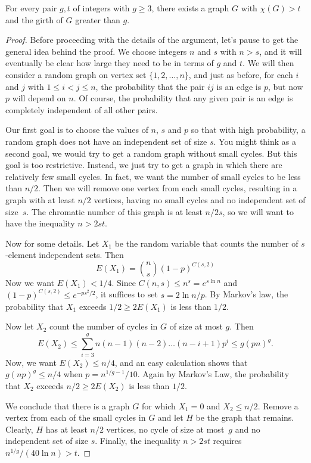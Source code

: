 \begin{theorem}[Erd\H{o}s]\label{thm:girth}
For every pair $g,t$ of integers with $g\ge3$, there exists
a graph $G$ with $\chi(G)>t$ and the girth of $G$ greater than $g$.
\end{theorem}

\begin{proof}
Before proceeding with the details of the argument, let's pause
to get the general idea behind the proof.  We choose integers
$n$ and $s$ with $n>s$, and it will eventually be clear how
large they need to be in terms of $g$ and $t$.  We will
then consider a random graph on vertex set $\{1,2,\dots,n\}$,
and just as before, for each $i$ and $j$ with $1\le i<j\le n$,
the probability that the pair $ij$ is an edge is $p$, but now
$p$ will depend on $n$.  Of course, the probability that any
given pair is an edge is completely independent of all other
pairs.

Our first goal is to choose the values of $n$, $s$ and $p$ so that
with high probability, a random graph does not have an independent
set of size $s$.  You might think as a second goal, we would try
to get a random graph without small cycles.  But this goal is too
restrictive.  Instead, we just try to get a graph in which there
are relatively few small cycles.  In fact, we want the number
of small cycles to be less than $n/2$.  Then we will remove one
vertex from each small cycles, resulting in a graph with at
least $n/2$ vertices, having no small cycles and no independent
set of size~$s$.  The chromatic number of this graph is at least
$n/2s$, so we will want to have the inequality $n>2st$.

Now for some details.  Let $X_1$ be the random variable that counts
the number of $s$-element independent sets.  Then
\[
E(X_1)=\binom{n}{s}(1-p)^{C(s,2)}
\]
Now we want $E(X_1)<1/4$.  Since $C(n,s)\le n^s=e^{s\ln n}$ and
$(1-p)^{C(s,2)}\le e^{-ps^2/2}$, it suffices to set
$s=2\ln n/p$.  By Markov's law, the probability that $X_1$ exceeds
$1/2\ge 2E(X_1)$ is less than $1/2$.

Now let $X_2$ count the number of cycles in $G$ of size at most $g$.
Then
\[
E(X_2)\le \sum_{i=3}^g n(n-1)(n-2)\dots(n-i+1) p^i\le g(pn)^g.
\]
Now, we want $E(X_2)\le n/4$, and an easy calculation shows that
$g(np)^g\le n/4$ when $p=n^{1/g-1}/10$.  Again by Markov's Law,
the probability that $X_2$ exceeds $n/2\ge 2E(X_2)$ is less than $1/2$.

We conclude that there is a graph $G$ for which $X_1=0$ and $X_2\le n/2$.
Remove a vertex from each of the small cycles in $G$ and let $H$ be
the graph that remains.  Clearly, $H$ has at least $n/2$ vertices,
no cycle of size at most~$g$ and no independent set of size $s$. 
Finally, the inequality $n>2st$ requires $n^{1/g}/(40\ln n)>t$.
\end{proof}

